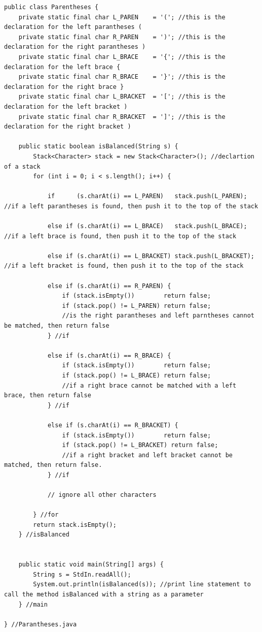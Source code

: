 \documentclass{article}
\begin{document}
\begin{enumerate}
\begin{lstlisting}
public class Parentheses {
    private static final char L_PAREN    = '('; //this is the declaration for the left parantheses (
    private static final char R_PAREN    = ')'; //this is the declaration for the right parantheses )
    private static final char L_BRACE    = '{'; //this is the declaration for the left brace {
    private static final char R_BRACE    = '}'; //this is the declaration for the right brace }
    private static final char L_BRACKET  = '['; //this is the declaration for the left bracket )
    private static final char R_BRACKET  = ']'; //this is the declaration for the right bracket )

    public static boolean isBalanced(String s) {
        Stack<Character> stack = new Stack<Character>(); //declartion of a stack
        for (int i = 0; i < s.length(); i++) {

            if      (s.charAt(i) == L_PAREN)   stack.push(L_PAREN); //if a left parantheses is found, then push it to the top of the stack

            else if (s.charAt(i) == L_BRACE)   stack.push(L_BRACE); //if a left brace is found, then push it to the top of the stack

            else if (s.charAt(i) == L_BRACKET) stack.push(L_BRACKET); //if a left bracket is found, then push it to the top of the stack

            else if (s.charAt(i) == R_PAREN) {
                if (stack.isEmpty())        return false;
                if (stack.pop() != L_PAREN) return false;
                //is the right parantheses and left parntheses cannot be matched, then return false
            } //if

            else if (s.charAt(i) == R_BRACE) {
                if (stack.isEmpty())        return false;
                if (stack.pop() != L_BRACE) return false;
                //if a right brace cannot be matched with a left brace, then return false
            } //if

            else if (s.charAt(i) == R_BRACKET) {
                if (stack.isEmpty())        return false;
                if (stack.pop() != L_BRACKET) return false;
                //if a right bracket and left bracket cannot be matched, then return false. 
            } //if

            // ignore all other characters

        } //for
        return stack.isEmpty(); 
    } //isBalanced


    public static void main(String[] args) {
        String s = StdIn.readAll();
        System.out.println(isBalanced(s)); //print line statement to call the method isBalanced with a string as a parameter
    } //main

} //Parantheses.java
\end{lstlisting}
\end{enumerate}
\end{document}
